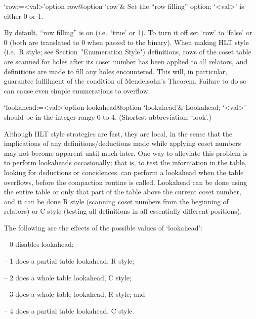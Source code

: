 \enditems


\beginitems

\>`row:=<val>'{option row}@{option `row'}&
Set the ``row filling'' option; `<val>' is either 0 or 1.

By default, ``row filling'' is on (i.e.~`true' or 1). To turn  it  off
set `row' to `false' or 0 (both are translated to 0 when passed to the
{\ACE}  binary).  When   making   HLT   style   (i.e.~R   style;   see
Section~"Enumeration Style") definitions, rows of the coset table  are
scanned for holes after its coset  number  has  been  applied  to  all
relators, and definitions are made to fill any holes encountered. This
will,  in  particular,  guarantee  fulfilment  of  the  condition   of
Mendelsohn's  Theorem.  Failure  to  do  so  can  cause  even   simple
enumerations to overflow.

\>`lookahead:=<val>'{option lookahead}@{option `lookahead'}&
Lookahead; `<val>' should be in the integer range 0 to 4.
(Shortest abbreviation: `look'.)
  
Although HLT style strategies are fast, they are local, in  the  sense
that  the  implications  of  any  definitions/deductions  made   while
applying coset numbers may not become apparent until much  later.  One
way to alleviate this problem is to perform  lookaheads  occasionally;
that is, to test the information in the table, looking for  deductions
or  concidences.  {\ACE}  can  perform  a  lookahead  when  the  table
overflows, before the compaction routine is called. Lookahead  can  be
done using the entire table or only that part of the table  above  the
current coset number, and it  can  be  done  R style  (scanning  coset
numbers from the  beginning  of  relators)  or  C style  (testing  all
definitions in all essentially different positions).

The following are the effects of the possible values of `lookahead':

\beginlist%

\item{--} 0 disables lookahead;
\item{--} 1 does a partial table lookahead, R style; 
\item{--} 2 does a whole table lookahead, C style; 
\item{--} 3 does a whole table lookahead, R style; and
\item{--} 4 does a partial table lookahead, C style.  

